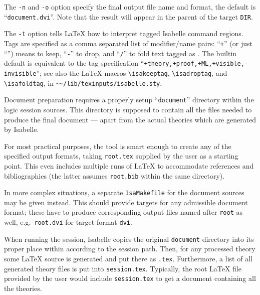 \begin{isabellebody}
\begin{isamarkuptext}
  \medskip The \verb|-n| and \verb|-o| option specify
  the final output file name and format, the default is ``\verb|document.dvi|''.  Note that the result will appear in the parent of
  the target \verb|DIR|.

  \medskip The \verb|-t| option tells {\LaTeX} how to interpret
  tagged Isabelle command regions.  Tags are specified as a comma
  separated list of modifier/name pairs: ``\verb|+|'' (or just ``'') means to keep, ``\verb|-|'' to drop, and ``\verb|/|'' to
  fold text tagged as .  The builtin default is equivalent
  to the tag specification ``\verb|+theory,+proof,+ML,+visible,-invisible|''; see also the {\LaTeX}
  macros \verb|\isakeeptag|, \verb|\isadroptag|, and
  \verb|\isafoldtag|, in \verb|~~/lib/texinputs/isabelle.sty|.

  \medskip Document preparation requires a properly setup ``\verb|document|'' directory within the logic session sources.  This
  directory is supposed to contain all the files needed to produce the
  final document --- apart from the actual theories which are
  generated by Isabelle.

  \medskip For most practical purposes, the \hyperlink{tool.document}{\mbox{}} tool is
  smart enough to create any of the specified output formats, taking
  \verb|root.tex| supplied by the user as a starting point.  This
  even includes multiple runs of {\LaTeX} to accommodate references
  and bibliographies (the latter assumes \verb|root.bib| within
  the same directory).

  In more complex situations, a separate \verb|IsaMakefile| for
  the document sources may be given instead.  This should provide
  targets for any admissible document format; these have to produce
  corresponding output files named after \verb|root| as well,
  e.g.\ \verb|root.dvi| for target format \verb|dvi|.

  \medskip When running the session, Isabelle copies the original
  \verb|document| directory into its proper place within
  \hyperlink{setting.ISABELLE-BROWSER-INFO}{\mbox{}} according to the session path.
  Then, for any processed theory  some {\LaTeX} source is
  generated and put there as \verb|.tex|.
  Furthermore, a list of all generated theory files is put into
  \verb|session.tex|.  Typically, the root {\LaTeX} file provided
  by the user would include \verb|session.tex| to get a document
  containing all the theories.


\end{isamarkuptext}
\end{isabellebody}
